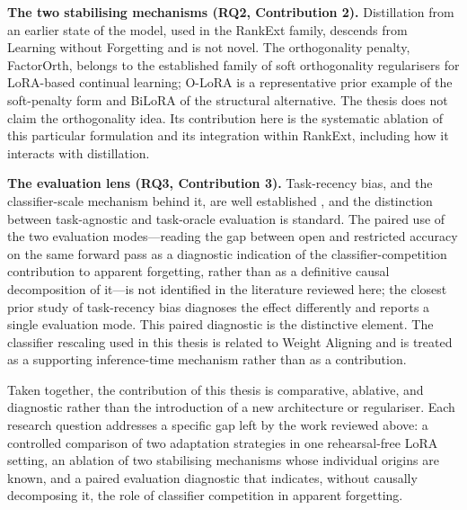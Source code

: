 \textbf{The two stabilising mechanisms (RQ2, Contribution 2).} Distillation from
an earlier state of the model, used in the RankExt family, descends from
Learning without Forgetting \parencite{li2016learning} and is not novel. The
orthogonality penalty, FactorOrth, belongs to the established family of
soft orthogonality regularisers for LoRA-based continual learning; O-LoRA
\parencite{wang2023orthogonal} is a representative prior example of the
soft-penalty form and BiLoRA \parencite{zhu2025bilora} of the structural
alternative. The thesis does not claim the
orthogonality idea. Its contribution here is the systematic ablation of
this particular formulation and its integration within RankExt, including
how it interacts with distillation.

\textbf{The evaluation lens (RQ3, Contribution 3).} Task-recency bias, and the
classifier-scale mechanism behind it, are well established \parencite{zhao2020maintaining,wu2019large,liang2023new}, and the distinction between
task-agnostic and task-oracle evaluation is standard. The paired use of the
two evaluation modes---reading the gap between open and restricted accuracy
on the same forward pass as a diagnostic indication of the
classifier-competition contribution to apparent forgetting, rather than as a
definitive causal decomposition of it---is not identified in the literature
reviewed here; the closest prior study of task-recency bias \parencite{liang2023new}
diagnoses the effect differently and reports a single evaluation
mode. This paired diagnostic is the distinctive element. The classifier
rescaling used in this thesis is related to Weight Aligning
\parencite{zhao2020maintaining} and is treated as a supporting
inference-time mechanism rather than as a contribution.



Taken together, the contribution of this thesis is comparative, ablative,
and diagnostic rather than the introduction of a new architecture or
regulariser. Each research question addresses a specific gap left by the
work reviewed above: a controlled comparison of two adaptation strategies
in one rehearsal-free LoRA setting, an ablation of two stabilising
mechanisms whose individual origins are known, and a paired evaluation
diagnostic that indicates, without causally decomposing it, the role of
classifier competition in apparent forgetting.
